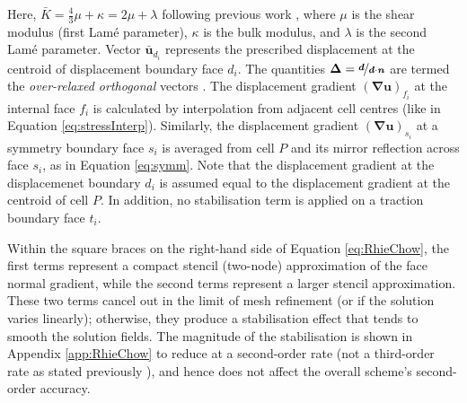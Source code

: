 \documentclass[sn-mathphys,Numbered]{sn-jnl}%
\newcommand{\bb}{\boldsymbol}
\begin{document}
Here, $\bar{K} = \frac{4}{3}\mu + \kappa = 2\mu + \lambda$ following previous work \cite{Jasak2000, Cardiff2017, Cardiff2018}, where $\mu$ is the shear modulus (first Lam\'{e} parameter), $\kappa$ is the bulk modulus, and $\lambda$ is the second Lam\'{e} parameter.
Vector $\bar{\bb{u}}_{d_i}$ represents the prescribed displacement at the centroid of displacement boundary face $d_i$.
The quantities $\bb{\Delta} = \nicefrac{\bb{d}}{\bb{d} \cdot \bb{n}}$ are termed the \emph{over-relaxed orthogonal} vectors \cite{Jasak1996}.
The displacement gradient $\left(\bb{\nabla} \bb{u} \right)_{f_i}$ at the internal face $f_i$ is calculated by interpolation from adjacent cell centres (like in Equation \ref{eq:stressInterp}).
Similarly, the displacement gradient $\left(\bb{\nabla} \bb{u} \right)_{s_i}$ at a symmetry boundary face $s_i$ is averaged from cell $P$ and its mirror reflection across face $s_i$, as in Equation \ref{eq:symm}.
Note that the displacement gradient at the displacemenet boundary $d_i$ is assumed equal to the displacement gradient at the centroid of cell $P$.
In addition, no stabilisation term is applied on a traction boundary face $t_i$.

Within the square braces on the right-hand side of Equation \ref{eq:RhieChow}, the first terms represent a compact stencil (two-node) approximation of the face normal gradient, while the second terms represent a larger stencil approximation.
These two terms cancel out in the limit of mesh refinement (or if the solution varies linearly); otherwise, they produce a stabilisation effect that tends to smooth the solution fields.
The magnitude of the stabilisation is shown in Appendix \ref{app:RhieChow} to reduce at a second-order rate (not a third-order rate as stated previously \citep{Demirdzic1995}), and hence does not affect the overall scheme's second-order accuracy.
\end{document}

